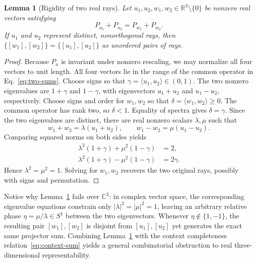 \documentclass[twocolumn,aps,pra,floatfix,amsmath,amssymb,longbibliography]{revtex4-2}
\newenvironment{handrewrite}{\leavevmode\color{blue}}{}
\newtheorem{lemma}[theorem]{Lemma}
\theoremstyle{definition}
\theoremstyle{remark}
\newcommand{\C}{\mathbb C}
\newcommand{\R}{\mathbb R}
\begin{document}
\begin{lemma}[Rigidity of two real rays]
\label{lem:real-rigidity}
Let $u_1,u_2,w_1,w_2\in\R^3\setminus\{0\}$ be nonzero real vectors satisfying
\begin{equation}
 P_{u_1}+P_{u_2}=P_{w_1}+P_{w_2}.
 \label{eq:two-sums}
\end{equation}
If $u_1$ and $u_2$ represent distinct, nonorthogonal rays, then
$\{[w_1],[w_2]\}=\{[u_1],[u_2]\}$ as unordered pairs of rays.
\end{lemma}

\begin{proof}
Because $P_x$ is invariant under nonzero rescaling, we may normalize all four
vectors to unit length.  All four vectors lie in the range of the common
operator in Eq.~\eqref{eq:two-sums}.  Choose signs so that
$\gamma=\langle u_1,u_2\rangle\in(0,1)$.  The two nonzero eigenvalues
are $1+\gamma$ and $1-\gamma$, with eigenvectors $u_1+u_2$ and
$u_1-u_2$, respectively.  Choose signs and order for $w_1,w_2$ so
that $\delta=\langle w_1,w_2\rangle\ge0$.  The common operator has rank two,
so $\delta<1$.  Equality of spectra gives
$\delta=\gamma$.  Since the two eigenvalues are distinct, there are real
nonzero scalars $\lambda,\mu$ such that
\[
 w_1+w_2=\lambda(u_1+u_2),\qquad
 w_1-w_2=\mu(u_1-u_2).
\]
Comparing squared norms on both sides yields
\begin{align*}
 \lambda^2(1+\gamma)+\mu^2(1-\gamma)&=2,\\
 \lambda^2(1+\gamma)-\mu^2(1-\gamma)&=2\gamma.
\end{align*}
Hence $\lambda^2=\mu^2=1$.  Solving for $w_1,w_2$ recovers the two
original rays, possibly with signs and permutation.
\end{proof}

\begin{handrewrite}
Notice why Lemma~\ref{lem:real-rigidity} fails over $\C^3$: in complex vector
space, the corresponding eigenvalue equations constrain only $|\lambda|^2=|\mu|^2=1$,
leaving an arbitrary relative phase $\eta=\mu/\lambda\in S^1$ between the two
eigenvectors.  Whenever $\eta\notin\{1,-1\}$, the resulting pair
$[w_1],[w_2]$ is disjoint from $[u_1],[u_2]$ yet generates the exact same
projector sum.  Combining Lemma~\ref{lem:real-rigidity} with the context
completeness relation~\eqref{eq:context-sum} yields a general combinatorial
obstruction to real three-dimensional representability.
\end{handrewrite}
\end{document}
